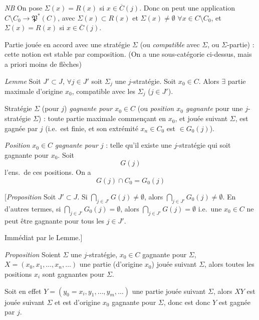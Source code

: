 \documentclass[11pt,a4paper]{article}
\begin{document}
\emph{NB} On pose $\Sigma(x) = R(x)$ si $x \in \overline{C}(j)$. Donc on peut
\struck{\ill{}}  une application
$C \setminus C_0 \to \mathfrak{P}^{*}(C)$, avec $\Sigma(x) \subset R(x)$ et
$\Sigma(x) \neq \emptyset$ $\forall x \in C \setminus C_0$, et
$\Sigma(x) = R(x)$ si $x \in \overline{C}(j)$.

Partie jouée en accord avec une stratégie $\Sigma$ (ou
\emph{compatible} avec $\Sigma$, ou $\Sigma$-partie) : cette notion est stable
par composition. (On a une sous-catégorie  ci-dessus,
mais a priori moins de flèches)

\emph{Lemme} Soit \struck{$\Sigma$} $J' \subset J$, $\forall j \in J'$ soit
$\Sigma_j$ une $j$-stratégie. Soit $x_0 \in C$. Alors $\exists$ partie
maximale d'origine $x_0$, compatible avec les $\Sigma_j$ ($j \in J'$).

Stratégie $\Sigma$ (pour $j$) \emph{gagnante pour $x_0 \in C$} (ou
\emph{position $x_0$ gagnante} pour une $j$-stratégie $\Sigma$) : toute partie
maximale commençant en $x_0$, et jouée suivant $\Sigma$, est gagnée par $j$
(i.e.\ est finie, et son extrémité $x_n \in C_0$ est $\in G_0(j)$).

\emph{Position} $x_0 \in C$ \emph{gagnante pour $j$} : telle qu'il existe une
$j$-stratégie qui soit gagnante pour $x_0$. Soit
\[
G(j)
\]
l'ens.\ de ces positions. On a
\[
G(j) \cap C_0 = G_0(j)
\]

[\emph{Proposition} Soit $J' \subset J$. Si
$\bigcap_{j \in J'} G(j) \neq \emptyset$, alors
$\bigcap_{j \in J'} G_0(j) \neq \emptyset$. En d'autres termes, si
$\bigcap_{j \in J'} G_0(j) = \emptyset$, alors
$\bigcap_{j \in J'} G(j) = \emptyset$ i.e.\ une $x_0 \in C$ ne peut être
gagnante pour tous les $j \in J'$.

Immédiat par le Lemme.]

\emph{Proposition} Soient $\Sigma$ une $j$-stratégie, $x_0 \in C$
 gagnante pour $\Sigma$,
$X = (x_0, x_1, \dots, x_n, \dots)$ une partie (d'origine $x_0$) jouée suivant
$\Sigma$, alors toutes les positions $x_i$ sont gagnantes pour $\Sigma$.

Soit en effet $Y = (y_0 = x_i, y_1, \dots, y_m, \dots)$ une partie
 jouée suivant $\Sigma$, alors $XY$ est jouée suivant
$\Sigma$ et est d'origine $x_0$ gagnante pour $\Sigma$, donc est
  donc $Y$ est gagnée
par $j$.
\end{document}
